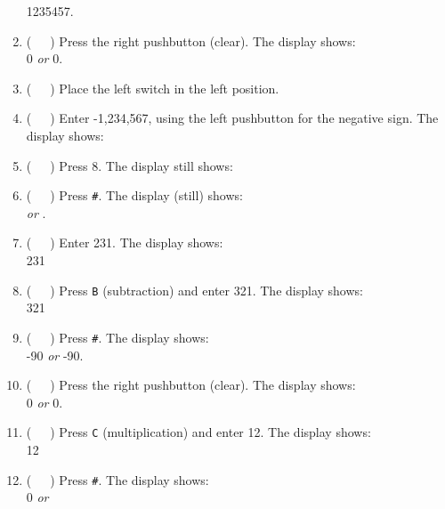 \begin{enumerate}
    {\dviiseg \phantom{8}1235457.}
\item (\ \ \ ) Press the right pushbutton (clear). The display shows: \\
    {\dviiseg \phantom{8888888}0} \hspace{1cm} \textit{or} \hspace{1cm}
    {\dviiseg \phantom{8888888}0.}
\item (\ \ \ ) Place the left switch in the left position.
\item (\ \ \ ) Enter -1,234,567, using the left pushbutton for the negative
    sign. The display shows: \\
    {}
\item (\ \ \ ) Press 8. The display still shows: \\
    {}
\item (\ \ \ ) Press \texttt{\#}. The display (still) shows: \\
    {} \hspace{1cm} \textit{or} \hspace{1cm}
    {.}
\item (\ \ \ ) Enter 231. The display shows: \\
    {\dviiseg \phantom{88888}231}
\item (\ \ \ ) Press \texttt{B} (subtraction) and enter 321. The display shows: \\
    {\dviiseg \phantom{88888}321}
\item (\ \ \ ) Press \texttt{\#}. The display shows: \\
    {\dviiseg \phantom{88888}-90} \hspace{1cm} \textit{or} \hspace{1cm}
    {\dviiseg \phantom{88888}-90.}
\item (\ \ \ ) Press the right pushbutton (clear). The display shows: \\
    {\dviiseg \phantom{8888888}0} \hspace{1cm} \textit{or} \hspace{1cm}
    {\dviiseg \phantom{8888888}0.}
\item (\ \ \ ) Press \texttt{C} (multiplication) and enter 12. The display
    shows:\\
    {\dviiseg \phantom{888888}12}
\item (\ \ \ ) Press \texttt{\#}. The display shows:\\
    {\dviiseg \phantom{8888888}0} \hspace{1cm} \textit{or} \hspace{1cm}

\end{enumerate}
